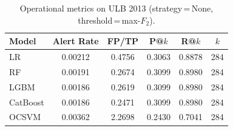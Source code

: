 \begin{table}[ht!]
\centering
\caption{Operational metrics on ULB 2013 (strategy\,=\,None, threshold\,=\,max-$F_2$).}
\label{tab:ops_ulb}
\begin{tabular}{l c c c c c}
\toprule
Model & Alert Rate & FP/TP & P@$k$ & R@$k$ & $k$ \\
\midrule
LR         & 0.00212 & 0.4756 & 0.3063 & 0.8878 & 284 \\
RF         & 0.00191 & 0.2674 & 0.3099 & 0.8980 & 284 \\
LGBM       & 0.00186 & 0.2619 & 0.3099 & 0.8980 & 284 \\
CatBoost   & 0.00186 & 0.2471 & 0.3099 & 0.8980 & 284 \\
OCSVM      & 0.00362 & 2.2698 & 0.2430 & 0.7041 & 284 \\
\bottomrule
\end{tabular}
\end{table}